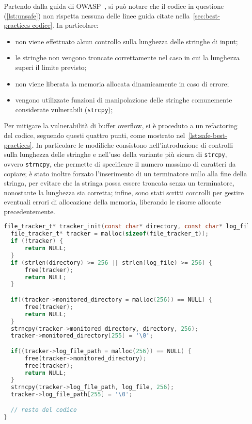 Partendo dalla guida di OWASP~\cite{owasp_best_practices}, si può notare che il
codice in questione (\autoref{lst:unsafe}) non rispetta nessuna delle linee
guida citate nella~\autoref{sec:best-practices-codice}. In particolare:
\begin{itemize}
  \item non viene effettuato alcun controllo sulla lunghezza delle stringhe di input;

  \item le stringhe non vengono troncate correttamente nel caso in cui la lunghezza
    superi il limite previsto;

  \item non viene liberata la memoria allocata dinamicamente in caso di errore;

  \item vengono utilizzate funzioni di manipolazione delle stringhe comunemente considerate
    vulnerabili (\texttt{strcpy});
\end{itemize}

Per mitigare la vulnerabilità di buffer overflow, si è proceduto a un
refactoring del codice, seguendo questi quattro punti, come mostrato nel~\autoref{lst:safe-best-practices}.
In particolare le modifiche consistono nell'introduzione di controlli sulla lunghezza
delle stringhe e nell'uso della variante più sicura di \texttt{strcpy}, ovvero \texttt{strncpy},
che permette di specificare il numero massimo di caratteri da copiare; è stato
inoltre forzato l'inserimento di un terminatore nullo alla fine della stringa, per
evitare che la stringa possa essere troncata senza un terminatore, nonostante la
lunghezza sia corretta; infine, sono stati scritti controlli per gestire
eventuali errori di allocazione della memoria, liberando le risorse allocate precedentemente.

\begin{lstlisting}[language=C, caption={Codice mitigato (best practices)}, label={lst:safe-best-practices}, style=changes_in_c]
file_tracker_t* tracker_init(const char* directory, const char* log_file) {
  file_tracker_t* tracker = malloc(sizeof(file_tracker_t));
  if (!tracker) {
      return NULL;
  }
  if (strlen(directory) >= 256 || strlen(log_file) >= 256) {
      free(tracker);
      return NULL;
  }

  if((tracker->monitored_directory = malloc(256)) == NULL) {
      free(tracker);
      return NULL;
  }
  strncpy(tracker->monitored_directory, directory, 256);
  tracker->monitored_directory[255] = '\0';

  if((tracker->log_file_path = malloc(256)) == NULL) {
      free(tracker->monitored_directory);
      free(tracker);
      return NULL;
  }
  strncpy(tracker->log_file_path, log_file, 256);
  tracker->log_file_path[255] = '\0';

  // resto del codice
}
\end{lstlisting}

